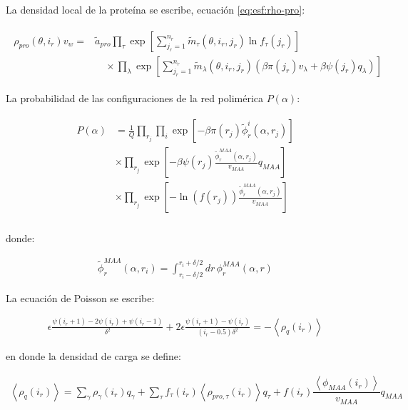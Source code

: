 La densidad local de la prote\'ina  se escribe, ecuaci\'on \ref{eq:esf:rho-pro}:

\begin{align}
	\begin{aligned}
		\rho_{pro}(\theta, i_r)v_w = &\tilde{a}_{pro} \prod_\tau\exp\left[ \sum^{n_r}_{j_r = 1} \tilde{m}_\tau(\theta,i_r,j_r) \ln f_\tau(j_r)\right] \\
		& \hspace{1em} \times \prod_\lambda \exp \left[ \sum^{n_r}_{j_r = 1} \tilde{m}_\lambda(\theta,i_r, j_r)\left(\beta\pi(j_r) v_\lambda+ \beta \psi(j_r)q_\lambda\right) \right]
	\end{aligned}
\end{align}

La probabilidad de las configuraciones de la red polim\'erica $P(\alpha)$: 

\begin{align}
	\begin{aligned}
		P(\alpha)&= \frac{1}{Q}\prod_{r_j}\prod_i \exp\left[{- {\beta\pi(r_j) \tilde{\phi}^i_r(\alpha,r_j)}}\right] \\
		& \times \prod_{r_j} \exp \left[ - \beta \psi(r_j)\frac{\tilde{ \phi}^{MAA}_r(\alpha,r_j)}{v_{MAA}} q_{MAA}  \right] \\
		& \times \prod_{r_j} \exp\left[ - { \ln(f(r_j))\frac{\tilde{ \phi}^{MAA}_r(\alpha,r_j)}{v_{MAA}}}\right] \\
	\end{aligned}
\end{align}

\noindent donde:

\begin{align}
	\tilde{ \phi}^{MAA}_r(\alpha,r_i) = \int_{r_i -\delta/2}^{r_i + \delta/2} dr \, \phi^{MAA}_r(\alpha,r)
\end{align}

La ecuaci\'on de Poisson se escribe:

\begin{align}
	\epsilon \frac{\psi(i_r +1) -2 \psi(i_r) + \psi(i_r -1)}{\delta ^2} + 2\epsilon \frac{\psi(i_r +1) -\psi(i_r)}{(i_r -0.5)\delta ^2}= -\left<\rho_q(i_r)\right>
	\label{eq:esf:poisson-ir}
\end{align}

\noindent en donde la densidad de carga se define:

\begin{align}
	\left<\rho_q(i_r)\right> = \sum_{\gamma } {\rho_\gamma(i_r) q_\gamma + \sum_\tau{f_\tau(i_r) \left<\rho_{pro,\tau}(i_r)\right> q_\tau} +  f(i_r)\dfrac{\left<\phi_{MAA}(i_r)\right>}{v_{MAA}}q_{MAA}}
\end{align}

